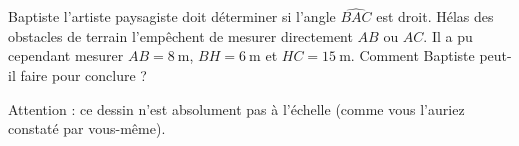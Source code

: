 
\begin{exercice}\label{exosmath-0837}

    Baptiste l'artiste paysagiste doit déterminer si l'angle \( \widehat{BAC}\) est droit. Hélas des obstacles de terrain l'empêchent de mesurer directement \( AB\) ou \( AC\). Il a pu cependant mesurer \( AB=\SI{8}{\meter}\), \( BH=\SI{6}{\meter}\) et \( HC=\SI{15}{\meter}\). Comment Baptiste peut-il faire pour conclure ?

\begin{center}
   
\end{center}
Attention : ce dessin n'est absolument pas à l'échelle (comme vous l'auriez constaté par vous-même).

\end{exercice}
